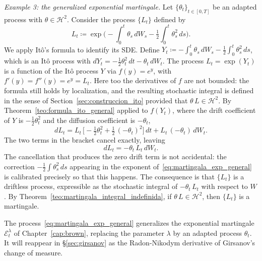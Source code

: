 \documentclass[11pt,a4paper,oneside]{report}
\theoremstyle{plain}
\theoremstyle{definition}
\theoremstyle{remark}
\newcommand{\1}{\mathbf{1}}
\newcommand{\eqdef}{\coloneqq}
\begin{document}
\medskip

\noindent\textit{Example 3: the generalized exponential martingale.}
Let $\{\theta_t\}_{t \in [0, T]}$ be an adapted process with
$\theta \in \mathcal{H}^2$. Consider the process $\{L_t\}$ defined by
\begin{equation}\label{eq:martingala_exp_general}
  L_t \eqdef \exp\!\biggl(- \int_0^t \theta_s\, dW_s
                           - \tfrac{1}{2} \int_0^t \theta_s^2\, ds\biggr).
\end{equation}
We apply Itô's formula to identify its SDE. Define
$Y_t \eqdef -\int_0^t \theta_s\, dW_s - \tfrac{1}{2} \int_0^t \theta_s^2\, ds$,
which is an Itô process with
$dY_t = -\tfrac{1}{2} \theta_t^2\, dt - \theta_t\, dW_t$. The process
$L_t = \exp(Y_t)$ is a function of the Itô process $Y$ via
$f(y) = e^y$, with $f'(y) = f''(y) = e^y = L_t$. Here too the derivatives of $f$ are not bounded: the formula still holds by localization, and the resulting stochastic integral is defined in the sense of Section~\ref{sec:construccion_ito} provided that $\theta\, L \in \mathcal{H}^2$. By
Theorem~\ref{teo:formula_ito_general} applied to $f(Y_t)$, where the
drift coefficient of $Y$ is $-\tfrac{1}{2}\theta_t^2$ and the
diffusion coefficient is $-\theta_t$,
\begin{equation*}
  dL_t = L_t\, \biggl[-\tfrac{1}{2}\theta_t^2 +
                       \tfrac{1}{2}\, (-\theta_t)^2\biggr]\, dt
        + L_t\, (-\theta_t)\, dW_t.
\end{equation*}
The two terms in the bracket cancel exactly, leaving
\begin{equation}\label{eq:sde_martingala_exp}
  dL_t = -\theta_t\, L_t\, dW_t.
\end{equation}
The cancellation that produces the zero drift term is not accidental:
the correction $-\tfrac{1}{2}\int \theta_s^2\, ds$ appearing in the
exponent of~\eqref{eq:martingala_exp_general} is calibrated precisely
so that this happens. The consequence is that $\{L_t\}$ is a
driftless process, expressible as the stochastic integral of
$-\theta_t\, L_t$ with respect to $W$. By
Theorem~\ref{teo:martingala_integral_indefinida}, if
$\theta\, L \in \mathcal{H}^2$, then $\{L_t\}$ is a martingale.

The process~\eqref{eq:martingala_exp_general} generalizes the
exponential martingale $\mathcal{E}_t^\lambda$ of
Chapter~\ref{cap:brown}, replacing the parameter $\lambda$ by an
adapted process $\theta_t$. It will reappear in
§\ref{sec:girsanov} as the Radon-Nikodym derivative of Girsanov's
change of measure.
\end{document}
